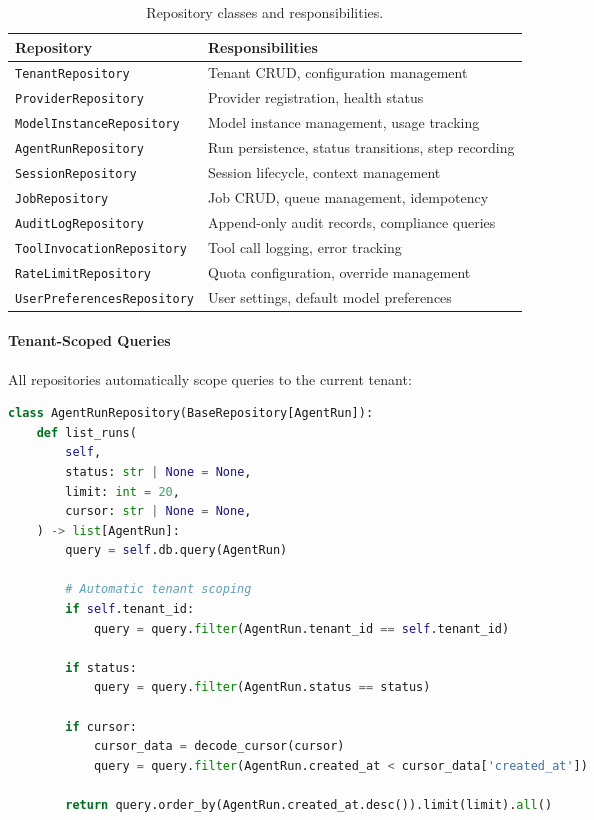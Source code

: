 \begin{table}[htbp]
    \centering
    \caption{Repository classes and responsibilities.}
    \label{tab:repository-inventory}
    \small
    \begin{tabular}{ll}
        \toprule
        \textbf{Repository} & \textbf{Responsibilities} \\
        \midrule
        \texttt{TenantRepository} & Tenant CRUD, configuration management \\
        \texttt{ProviderRepository} & Provider registration, health status \\
        \texttt{ModelInstanceRepository} & Model instance management, usage tracking \\
        \texttt{AgentRunRepository} & Run persistence, status transitions, step recording \\
        \texttt{SessionRepository} & Session lifecycle, context management \\
        \texttt{JobRepository} & Job CRUD, queue management, idempotency \\
        \texttt{AuditLogRepository} & Append-only audit records, compliance queries \\
        \texttt{ToolInvocationRepository} & Tool call logging, error tracking \\
        \texttt{RateLimitRepository} & Quota configuration, override management \\
        \texttt{UserPreferencesRepository} & User settings, default model preferences \\
        \bottomrule
    \end{tabular}
\end{table}

\paragraph{Tenant-Scoped Queries}
All repositories automatically scope queries to the current tenant:

\begin{lstlisting}[language=Python, caption={Tenant-scoped query implementation.}]
class AgentRunRepository(BaseRepository[AgentRun]):
    def list_runs(
        self,
        status: str | None = None,
        limit: int = 20,
        cursor: str | None = None,
    ) -> list[AgentRun]:
        query = self.db.query(AgentRun)
        
        # Automatic tenant scoping
        if self.tenant_id:
            query = query.filter(AgentRun.tenant_id == self.tenant_id)
        
        if status:
            query = query.filter(AgentRun.status == status)
        
        if cursor:
            cursor_data = decode_cursor(cursor)
            query = query.filter(AgentRun.created_at < cursor_data['created_at'])
        
        return query.order_by(AgentRun.created_at.desc()).limit(limit).all()
\end{lstlisting}

